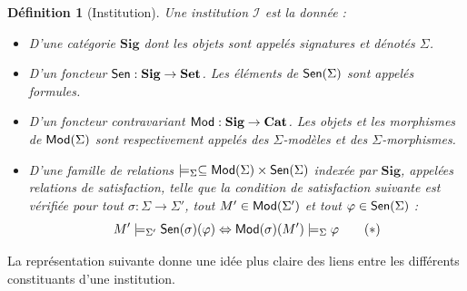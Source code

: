 \documentclass[11pt,a4paper]{report}
\newtheorem{defi}[theo]{Définition}
\newcommand{\ph}{\varphi}
\newcommand{\itemz}{\item[$\triangleright$]}
\newcommand{\gr}{\textbf}
\newcommand{\I}{\mathcal{I}}
\renewcommand{\iff}{\Leftrightarrow}
\newcommand{\info}[1]{\text{{\fontfamily{lmss}\selectfont #1}}}
\newcommand{\Mod}{\info{Mod}}
\newcommand{\Sen}{\info{Sen}}
\newcommand{\1}{\mathbbm{1}}
\begin{document}
\begin{defi}[Institution]
Une institution $\I$ est la donnée :
\begin{itemize}
\setlength\itemsep{-0.3em}
\itemz D'une catégorie $\gr{Sig}$ dont les objets sont appelés signatures et dénotés $\Sigma$.
\itemz D'un foncteur $\Sen : \gr{Sig} \to \gr{Set}$. Les éléments de $\Sen (\Sigma)$ sont appelés formules.
\itemz D'un foncteur contravariant $\Mod : \gr{Sig} \to \gr{Cat}$. Les objets et les morphismes de $\Mod(\Sigma)$ sont respectivement appelés des $\Sigma$-modèles et des $\Sigma$-morphismes.
\itemz D'une famille de relations $\models_\Sigma \subseteq \Mod(\Sigma) \times \Sen(\Sigma)$ indexée par $\gr{Sig}$, appelées relations de satisfaction, telle que la condition de satisfaction suivante est vérifiée pour tout $\sigma : \Sigma \to \Sigma'$, tout $M' \in \Mod(\Sigma')$ et tout $\ph \in \Sen(\Sigma)$ :
\begin{equation} M' \models_{\Sigma'} \Sen(\sigma)(\ph) \iff \Mod(\sigma)(M') \models_{\Sigma} \ph \label{condsat} \tag{$\ast$} \end{equation}
\end{itemize}
\end{defi}
La représentation suivante donne une idée plus claire des liens entre les différents constituants d'une institution.
\begin{center}
\end{center}
\end{document}
